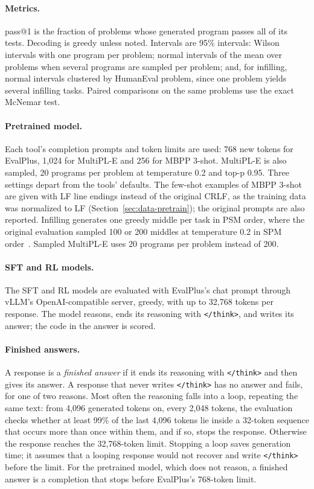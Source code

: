 \documentclass[sigconf,nonacm,balance=false]{acmart}
\begin{document}
\paragraph{Metrics.} pass@1 is the fraction of problems whose generated program passes all of its
tests. Decoding is greedy unless noted. Intervals are 95\% intervals: Wilson intervals with one
program per problem; normal intervals of the mean over problems when several programs are sampled per problem; and,
for infilling, normal intervals clustered by HumanEval problem, since one problem yields several infilling tasks.
Paired comparisons on the same problems use the exact McNemar test.

\paragraph{Pretrained model.} Each tool's completion prompts and token limits are used: 768 new tokens for EvalPlus,
1,024 for MultiPL-E and 256 for MBPP 3-shot. MultiPL-E is also sampled, 20 programs per problem at temperature 0.2
and top-p 0.95. Three settings depart from the tools' defaults. The few-shot examples of MBPP 3-shot are given with
LF line endings instead of the original CRLF, as the training data was normalized to LF
(Section~\ref{sec:data-pretrain}); the original prompts are also reported. Infilling generates one greedy middle per
task in PSM order, where the original evaluation sampled 100 or 200 middles at temperature 0.2 in SPM
order~\cite{bavarian2022fim}. Sampled MultiPL-E uses 20 programs per problem instead of 200.

\paragraph{SFT and RL models.} The SFT and RL models are evaluated with EvalPlus's chat prompt through vLLM's
OpenAI-compatible server, greedy, with up to 32,768 tokens per response. The model reasons, ends its reasoning with
\texttt{</think>}, and writes its answer; the code in the answer is scored.

\paragraph{Finished answers.} A response is a \emph{finished answer} if it ends its reasoning with \texttt{</think>}
and then gives its answer. A response that never writes \texttt{</think>} has no answer and fails, for one of two
reasons. Most often the reasoning falls into a loop, repeating the same text: from 4,096 generated tokens on, every
2,048 tokens, the evaluation checks whether at least 99\% of the last 4,096 tokens lie inside a 32-token sequence that
occurs more than once within them, and if so, stops the response. Otherwise the response reaches the 32,768-token
limit. Stopping a loop saves generation time; it assumes that a looping response would not recover and write
\texttt{</think>} before the limit. For the pretrained model, which does not reason, a finished answer is a completion
that stops before EvalPlus's 768-token limit.
\end{document}
